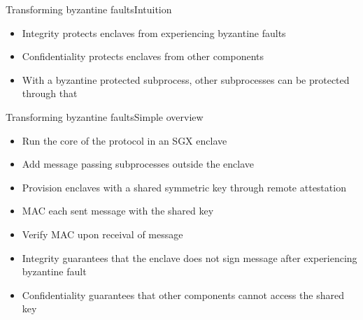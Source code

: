\documentclass{beamer}
\begin{document}
\begin{frame}{Transforming byzantine faults}{Intuition}
	\begin{itemize}
		\item Integrity protects enclaves from experiencing byzantine faults

  	\vfill

		\item Confidentiality protects enclaves from other components

  	\vfill

		\item With a byzantine protected subprocess, other subprocesses can be protected through that

	\end{itemize}
\end{frame}

\begin{frame}{Transforming byzantine faults}{Simple overview}
	\begin{itemize}
		\item Run the core of the protocol in an SGX enclave

  	\vfill

		\item Add message passing subprocesses outside the enclave

  	\vfill

		\item Provision enclaves with a shared symmetric key through remote attestation

  	\vfill

		\item MAC each sent message with the shared key

  	\vfill

		\item Verify MAC upon receival of message

  	\vfill

		\item Integrity guarantees that the enclave does not sign message after experiencing byzantine fault

  	\vfill

  	\item Confidentiality guarantees that other components cannot access the shared key

	\end{itemize}
\end{frame}
\end{document}
